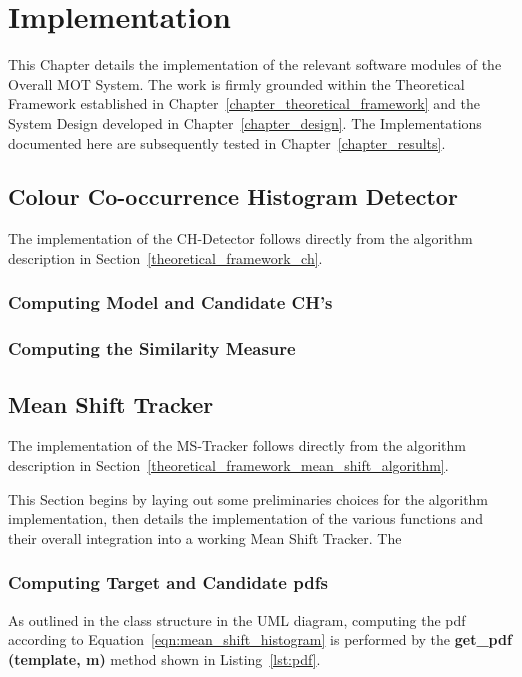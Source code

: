 \chapter{Implementation}\label{chapter_implementation}

This Chapter details the implementation of the relevant software modules of the
Overall MOT System. The work is firmly grounded within the Theoretical Framework
established in Chapter~\ref{chapter_theoretical_framework} and the System Design
developed in Chapter~\ref{chapter_design}. The Implementations documented here
are subsequently tested in Chapter~\ref{chapter_results}.

\section{Colour Co-occurrence Histogram Detector}\label{implementation_ch}
The implementation of the CH-Detector follows directly from the algorithm
description in Section~\ref{theoretical_framework_ch}.

\subsection{Computing Model and Candidate CH's}


\subsection{Computing the Similarity Measure}


\section{Mean Shift Tracker}\label{implementation_mean_shift_tracker}
The implementation of the MS-Tracker follows directly from the algorithm
description in Section~\ref{theoretical_framework_mean_shift_algorithm}.

This Section begins by laying out some preliminaries choices for the algorithm
implementation, then details the implementation of the various functions and
their overall integration into a working Mean Shift Tracker. The  

\subsection{Computing Target and Candidate pdfs}
As outlined in the class structure in the UML diagram, %
computing the pdf according to Equation~\ref{eqn:mean_shift_histogram} is
performed by the \textbf{get\_pdf (template, m)} method shown in
Listing~\ref{lst:pdf}.

